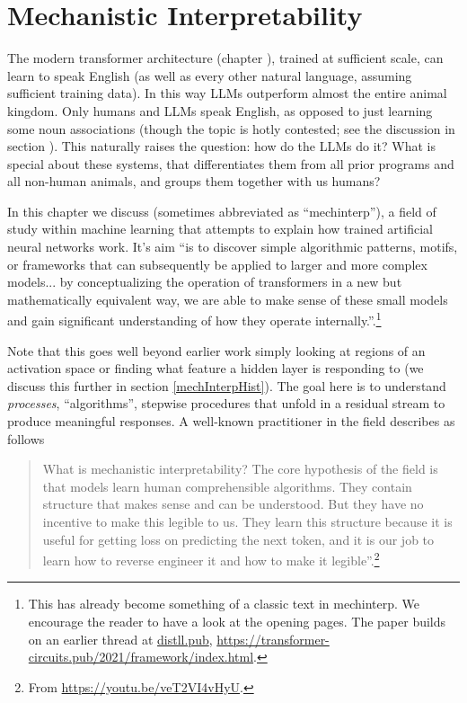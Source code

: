 \chapter{Mechanistic Interpretability}\label{ch_mechinterp}


The modern transformer architecture (chapter ), trained at sufficient scale, can learn to speak English (as well as every other natural language, assuming sufficient training data). In this way LLMs outperform almost the entire animal kingdom. Only humans and LLMs speak English, as opposed to just learning some noun associations (though the topic is hotly contested; see the discussion in section ). This naturally raises the question: how do the LLMs do it? What is special about these systems, that differentiates them from all prior programs and all non-human animals, and groups them together with us humans?

In this chapter we discuss  (sometimes abbreviated as ``mechinterp''), a field of study within machine learning that attempts to explain how trained artificial neural networks work. It’s aim ``is to discover simple algorithmic patterns, motifs, or frameworks that can subsequently be applied to larger and more complex models... by conceptualizing the operation of transformers in a new but mathematically equivalent way, we are able to make sense of these small models and gain significant understanding of how they operate internally.''\cite{elhage2021mathematical}.\footnote{This has already become something of a classic text in mechinterp. We encourage the reader to have a look at the opening pages. The paper builds on an earlier thread at \url{distll.pub},  \url{https://transformer-circuits.pub/2021/framework/index.html}.} 

Note that this goes well beyond earlier work simply looking at regions of an activation space or finding what feature a hidden layer is responding to (we discuss this further in section \ref{mechInterpHist}). The goal here is to understand \emph{processes}, ``algorithms'', stepwise procedures that unfold in a residual stream to produce meaningful responses.  A well-known practitioner in the field describes as follows

\begin{quote}
What is mechanistic interpretability? The core hypothesis of the field is that models learn human comprehensible algorithms. They contain structure that makes sense and can be understood. But they have no incentive to make this legible to us. They learn this structure because it is useful for getting loss on predicting the next token, and it is our job to learn how to reverse engineer it and how to make it legible''.\footnote{From \url{https://youtu.be/veT2VI4vHyU}.}
\end{quote}

